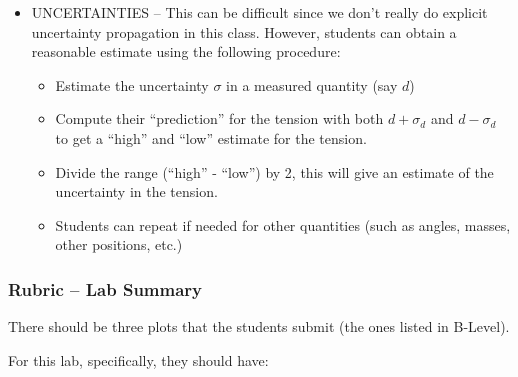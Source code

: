 \documentclass[fleqn,letterpaper]{article}
\begin{document}
\begin{itemize}
{\begin{itemize}
  \end{itemize}
}
\item{UNCERTAINTIES -- This can be difficult since we don't really do explicit uncertainty propagation in this class.  However, students can obtain a reasonable estimate using the following procedure:
  \begin{itemize}
  \item{Estimate the uncertainty $\sigma$ in a measured quantity (say $d$)}
  \item{Compute their ``prediction'' for the tension with both $d + \sigma_d$ and $d - \sigma_d$ to get a ``high'' and ``low'' estimate for the tension.}
  \item{Divide the range (``high'' - ``low'') by 2, this will give an estimate of the uncertainty in the tension.}
  \item{Students can repeat if needed for other quantities (such as angles, masses, other positions, etc.)}
  \end{itemize}}
\end{itemize}

\subsubsection*{Rubric -- Lab Summary}

There should be three plots that the students submit (the ones listed in B-Level).

For this lab, specifically, they should have:
\end{document}
